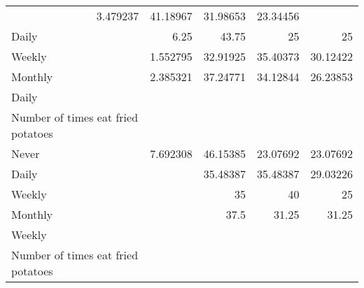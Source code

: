 \documentclass{article}
\begin{document}
\begin{tabular}{lllll}
  \multicolumn{1}{|r}{3.479237} &
  \multicolumn{1}{r}{41.18967} &
  \multicolumn{1}{r}{31.98653} &
  \multicolumn{1}{r}{23.34456} \\
\multicolumn{1}{l}{\hspace{5em}Daily} &
  \multicolumn{1}{|r}{6.25} &
  \multicolumn{1}{r}{43.75} &
  \multicolumn{1}{r}{25} &
  \multicolumn{1}{r}{25} \\
\multicolumn{1}{l}{\hspace{5em}Weekly} &
  \multicolumn{1}{|r}{1.552795} &
  \multicolumn{1}{r}{32.91925} &
  \multicolumn{1}{r}{35.40373} &
  \multicolumn{1}{r}{30.12422} \\
\multicolumn{1}{l}{\hspace{5em}Monthly} &
  \multicolumn{1}{|r}{2.385321} &
  \multicolumn{1}{r}{37.24771} &
  \multicolumn{1}{r}{34.12844} &
  \multicolumn{1}{r}{26.23853} \\
\multicolumn{1}{l}{\hspace{3em}Daily} &
  \multicolumn{1}{|r}{} &
  \multicolumn{1}{r}{} &
  \multicolumn{1}{r}{} &
  \multicolumn{1}{r}{} \\
\multicolumn{1}{l}{\hspace{4em}Number of times eat fried potatoes} &
  \multicolumn{1}{|r}{} &
  \multicolumn{1}{r}{} &
  \multicolumn{1}{r}{} &
  \multicolumn{1}{r}{} \\
\multicolumn{1}{l}{\hspace{5em}Never} &
  \multicolumn{1}{|r}{7.692308} &
  \multicolumn{1}{r}{46.15385} &
  \multicolumn{1}{r}{23.07692} &
  \multicolumn{1}{r}{23.07692} \\
\multicolumn{1}{l}{\hspace{5em}Daily} &
  \multicolumn{1}{|r}{} &
  \multicolumn{1}{r}{35.48387} &
  \multicolumn{1}{r}{35.48387} &
  \multicolumn{1}{r}{29.03226} \\
\multicolumn{1}{l}{\hspace{5em}Weekly} &
  \multicolumn{1}{|r}{} &
  \multicolumn{1}{r}{35} &
  \multicolumn{1}{r}{40} &
  \multicolumn{1}{r}{25} \\
\multicolumn{1}{l}{\hspace{5em}Monthly} &
  \multicolumn{1}{|r}{} &
  \multicolumn{1}{r}{37.5} &
  \multicolumn{1}{r}{31.25} &
  \multicolumn{1}{r}{31.25} \\
\multicolumn{1}{l}{\hspace{3em}Weekly} &
  \multicolumn{1}{|r}{} &
  \multicolumn{1}{r}{} &
  \multicolumn{1}{r}{} &
  \multicolumn{1}{r}{} \\
\multicolumn{1}{l}{\hspace{4em}Number of times eat fried potatoes} &

\end{tabular}
\end{document}
